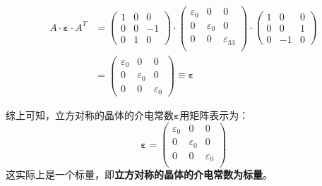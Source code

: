 \begin{itemize}[itemsep=0pt,parsep=0pt]
\begin{itemize}[itemsep=0pt,parsep=0pt]
            \begin{align*}
                A \cdot \boldsymbol{\varepsilon} \cdot A^{T}&=
                \left(
                \begin{array}{ccc}
                    1 & 0 & 0 \\
                    0 & 0 & -1\\
                    0 & 1 & 0
                \end{array}
                \right)
                \cdot
                \left(
                \begin{array}{ccc}
                    \varepsilon_{0} & 0 & 0 \\
                    0 & \varepsilon_{0} & 0 \\
                    0 & 0 & \varepsilon_{33} \\
                \end{array}
                \right)
                \cdot
                \left(
                \begin{array}{ccc}
                    1 & 0 & 0 \\
                    0 & 0 & 1 \\
                    0 & -1 & 0
                \end{array}
                \right)\\
                &=
                \left(
                \begin{array}{ccc}
                    \varepsilon_{0} & 0 & 0 \\
                    0 & \varepsilon_{0} & 0 \\
                    0 & 0 & \varepsilon_{0}
                \end{array}
                \right)
                \equiv \boldsymbol{\varepsilon}
            \end{align*}
        \end{itemize}
        综上可知，立方对称的晶体的介电常数$\boldsymbol{\varepsilon}$用矩阵表示为：
        \[
        \boldsymbol{\varepsilon}=
        \left(
        \begin{array}{ccc}
            \varepsilon_{0} & 0 & 0 \\
            0 & \varepsilon_{0} & 0 \\
            0 & 0 & \varepsilon_{0} \\
        \end{array}
        \right)
        \]
        这实际上是一个标量，即\textbf{立方对称的晶体的介电常数为标量}。


\end{itemize}
